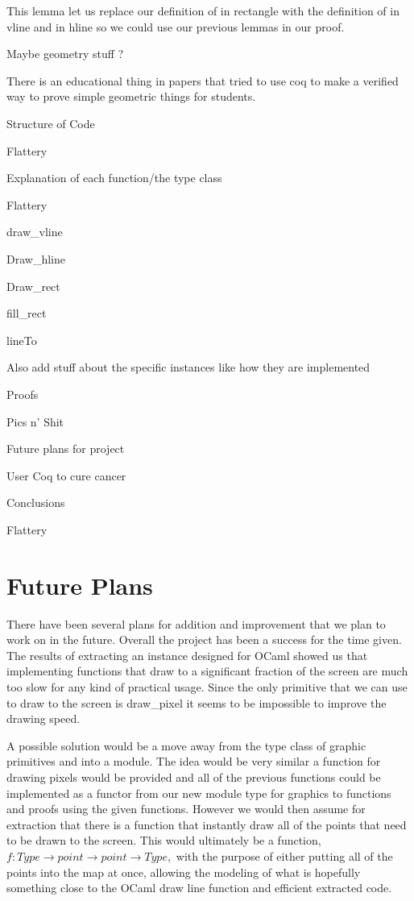 \documentclass{llncs}
\begin{document}
This lemma let us replace our definition of in rectangle with the definition of in vline and in hline so we could use our previous lemmas in our proof.


Maybe geometry stuff ? 

There is an educational thing in papers that tried to use coq to make a verified way to prove simple geometric things for students.

Structure of Code

Flattery

Explanation of each function/the type class

Flattery

draw\_vline

Draw\_hline

Draw\_rect

fill\_rect

lineTo

Also add stuff about the specific instances like how they are implemented

Proofs

Pics n’ Shit 

Future plans for project

User Coq to cure cancer 

Conclusions

Flattery




\section{Future Plans}
There have been several plans for addition and improvement that we plan to work on in the future.  Overall the project has been a success for the
time given.  The results of extracting an instance designed for OCaml showed us that implementing functions that draw to a significant fraction of the screen are much too slow for any kind of practical usage.  Since the only primitive that we can use to draw to the screen is draw\_pixel it seems to be impossible to improve the drawing speed.

A possible solution would be a move away from the type class of graphic primitives and into a module.  The idea would be very similar a function for drawing pixels would be provided and all of the previous functions could be implemented as a functor from our new module type for graphics to functions and proofs using the given functions.  However we would then assume for extraction that there is a function that instantly draw all of the points that need to be drawn to the screen.  This would ultimately be a function, $f :Type \rightarrow point \rightarrow point \rightarrow Type,$ with the purpose of either putting all of the points into the map at once, allowing the modeling of what is hopefully something close to the OCaml draw line function and efficient extracted code.
\end{document}
